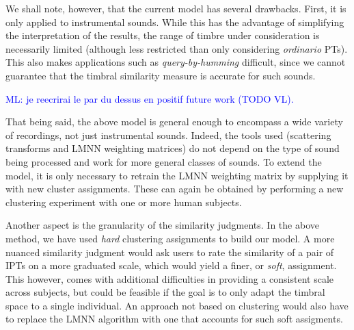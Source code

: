 \documentclass{bmcart}
\newcommand{\ml}[1]{\textcolor{blue}{ML: #1}}
\begin{document}
We shall note, however, that the current model has several drawbacks.
First, it is only applied to instrumental sounds.
While this has the advantage of simplifying the interpretation of the results, the range of timbre under consideration is necessarily limited (although less restricted than only considering \emph{ordinario} PTs).
This also makes applications such as \emph{query-by-humming} difficult, since we cannot guarantee that the timbral similarity measure is accurate for such sounds.

\ml{je reecrirai le par du dessus en positif future work (TODO VL).}

That being said, the above model is general enough to encompass a wide variety of recordings, not just instrumental sounds.
Indeed, the tools used (scattering transforms and LMNN weighting matrices) do not depend on the type of sound being processed and work for more general classes of sounds.
To extend the model, it is only necessary to retrain the LMNN weighting matrix by supplying it with new cluster assignments.
These can again be obtained by performing a new clustering experiment with one or more human subjects.

Another aspect is the granularity of the similarity judgments.
In the above method, we have used \emph{hard} clustering assignments to build our model.
A more nuanced similarity judgment would ask users to rate the similarity of a pair of IPTs on a more graduated scale, which would yield a finer, or \emph{soft}, assignment.
This however, comes with additional difficulties in providing a consistent scale across subjects, but could be feasible if the goal is to only adapt the timbral space to a single individual.
An approach not based on clustering would also have to replace the LMNN algorithm with one that accounts for such soft assigments.

\end{document}
